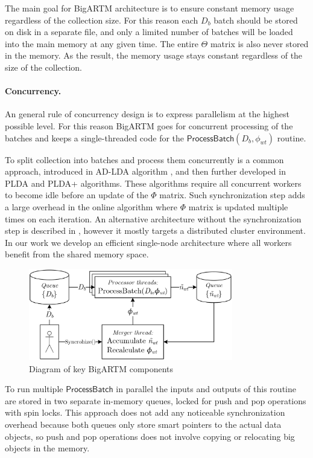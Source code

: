 \documentclass[russian]{llncs}
\newcommand{\kw}[1]{\textsf{#1}}
\begin{document}
The main goal for BigARTM architecture is to ensure constant memory usage regardless of the collection size.
For this reason each $D_b$ batch should be stored on disk in a separate file,
and only a limited number of batches will be loaded into the main memory at any given time.
The entire $\Theta$ matrix is also never stored in the memory.
As the result, the memory usage stays constant regardless of the size of the collection.

\paragraph{Concurrency.}
An general rule of concurrency design is to express parallelism at the highest possible level.
For this reason BigARTM goes for concurrent processing of the batches
and keeps a single-threaded code for the $\kw{ProcessBatch}(D_b, \phi_{wt})$ routine.

To split collection into batches and process them concurrently is a common approach,
introduced in AD-LDA algorithm \cite{newman2009distributed}, and
then further developed in PLDA \cite{wang2009plda} and PLDA{+} \cite{liu2011plda+} algorithms.
These algorithms require all concurrent workers to become idle before an update of the $\Phi$ matrix.
Such synchronization step adds a large overhead in the online algorithm where $\Phi$ matrix is updated multiple times on each iteration.
An alternative architecture without the synchronization step is described in \cite{smola2010architecture},
however it mostly targets a distributed cluster environment.
In our work we develop an efficient single-node architecture where all workers benefit from the shared memory space.

\begin{figure}[h!]
\begin{centering}
\includegraphics[height=40mm]{diagramm_artm_core.eps}
\caption{Diagram of key BigARTM components}
\label{fig:diagramm_artm_core}
\end{centering}
\end{figure}

To run multiple $\kw{ProcessBatch}$ in parallel the inputs and outputs of this routine are stored in two separate in-memory queues,
locked for push and pop operations with spin locks.
This approach does not add any noticeable synchronization overhead because
both queues only store smart pointers to the actual data objects,
so push and pop operations does not involve copying or relocating big objects in the memory.
\end{document}
